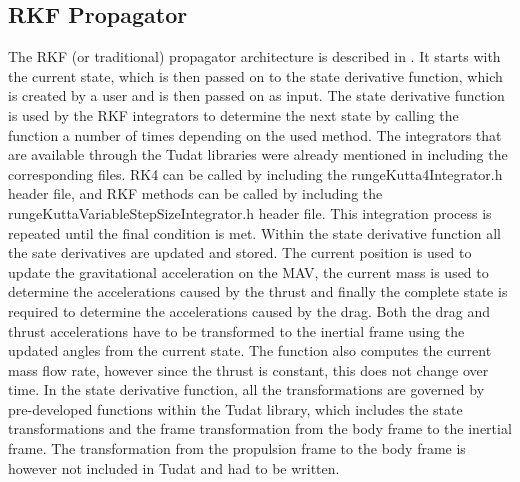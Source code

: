 %




\subsection{\ac{RKF} Propagator}
\label{subsec:rkpropagator}
The \ac{RKF} (or traditional) propagator architecture is described in . It starts with the current state, which is then passed on to the state derivative function, which is created by a user and is then passed on as input. The state derivative function is used by the \ac{RKF} integrators to determine the next state by calling the function a number of times depending on the used method. The integrators that are available through the \ac{Tudat} libraries were already mentioned in  including the corresponding files. \ac{RK4} can be called by including the rungeKutta4Integrator.h header file, and \ac{RKF} methods can be called by including the rungeKuttaVariableStepSizeIntegrator.h header file. This integration process is repeated until the final condition is met. Within the state derivative function all the sate derivatives are updated and stored. The current position is used to update the gravitational acceleration on the \ac{MAV}, the current mass is used to determine the accelerations caused by the thrust and finally the complete state is required to determine the accelerations caused by the drag. Both the drag and thrust accelerations have to be transformed to the inertial frame using the updated angles from the current state. The function also computes the current mass flow rate, however since the thrust is constant, this does not change over time. In the state derivative function, all the transformations are governed by pre-developed functions within the \ac{Tudat} library, which includes the state transformations and the frame transformation from the body frame to the inertial frame. The transformation from the propulsion frame to the body frame is however not included in \ac{Tudat} and had to be written.



